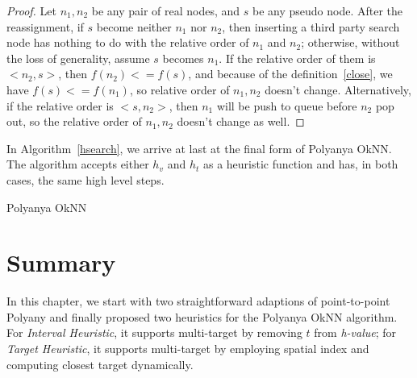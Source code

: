 \begin{proof}
  Let $n_1, n_2$ be any pair of real nodes, and $s$ be any pseudo node.  After the reassignment,
  if $s$ become neither $n_1$ nor $n_2$, then inserting a third party search node has nothing to do with the relative order of $n_1$
  and $n_2$; otherwise, without the loss of generality, assume $s$ becomes $n_1$. If the relative
  order of them is $<n_2, s>$, then $f(n_2) <= f(s)$, and
  because of the definition~\ref{close}, we have $f(s) <= f(n_1)$, so
  relative order of $n_1, n_2$ doesn't change. Alternatively, if the relative order is $<s, n_2>$,
  then $n_1$  will be push to queue before $n_2$ pop out, so the relative order of $n_1, n_2$ doesn't
  change as well.%
\end{proof}

In Algorithm~\ref{hsearch}, we arrive at last at the final form of Polyanya OkNN. The algorithm
accepts either $h_v$ and $h_t$ as a heuristic function and has, in both cases, the same high level steps.

\begin{algorithm}[!ht]
  
  \caption{Polyanya OkNN}
  \label{hsearch}
\end{algorithm}

\section{Summary}
In this chapter, we start with two straightforward adaptions of point-to-point Polyany
and finally proposed two heuristics for the Polyanya OkNN algorithm.
For \textit{Interval Heuristic}, it supports multi-target by
removing $t$ from \textit{h-value}; for \textit{Target Heuristic}, it supports multi-target by
employing spatial index and computing closest target dynamically.

